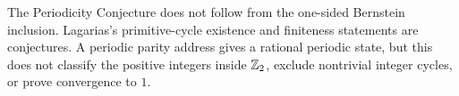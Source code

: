 \begin{nonclaim}
The Periodicity Conjecture does not follow from the one-sided Bernstein
inclusion.  Lagarias's primitive-cycle existence and finiteness statements
are conjectures.  A periodic parity address gives a rational periodic state,
but this does not classify the positive integers inside $\mathbb{Z}_{2}$, exclude
nontrivial integer cycles, or prove convergence to $1$.
\end{nonclaim}
